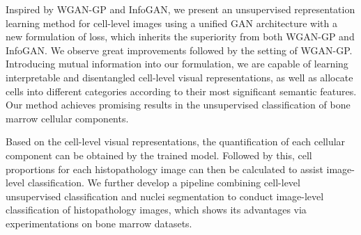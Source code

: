 \documentclass[journal]{IEEEtran}
\begin{document}


Inspired by WGAN-GP and InfoGAN, we present an unsupervised representation learning method for cell-level images using a unified GAN architecture with a new formulation of loss, which inherits the superiority from both WGAN-GP and InfoGAN. We observe great improvements followed by the setting of WGAN-GP. Introducing mutual information into our formulation, we are capable of learning interpretable and disentangled cell-level visual representations, as well as allocate cells into different categories according to their most significant semantic features. Our method achieves promising results in the unsupervised classification of bone marrow cellular components.

Based on the cell-level visual representations, the quantification of each cellular component can be obtained by the trained model. Followed by this, cell proportions for each histopathology image can then be calculated to assist image-level classification. We further develop a pipeline combining cell-level unsupervised classification and nuclei segmentation to conduct image-level classification of histopathology images, which shows its advantages via experimentations on bone marrow datasets.
\end{document}
